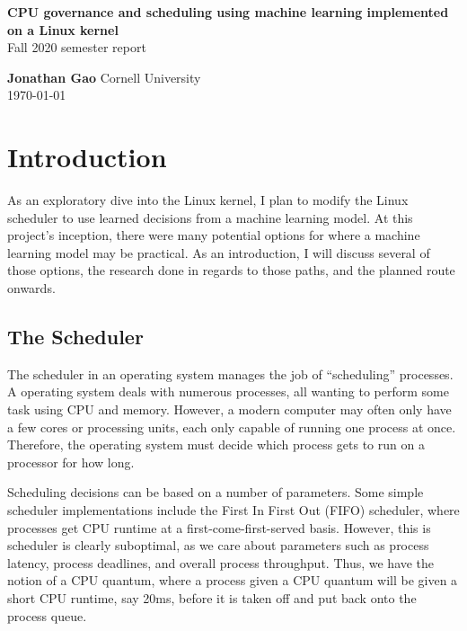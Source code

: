 \documentclass[12pt]{article}
\author{Jonathan Gao}
\def\ind{\hspace*{0.3in}}
\begin{document}
\begin{titlepage}
   \begin{center}
       \vspace*{5cm}
       {\huge\textbf{CPU governance and scheduling using machine learning implemented on a Linux kernel}}\\
       \vspace{1.5cm}
       {\large Fall 2020 semester report}
       \vspace{1.5cm}
       
       \textbf{Jonathan Gao}
       \vfill
       \vspace{0.8cm}
       Cornell University\\
       \today
            
   \end{center}
\end{titlepage}

\section*{Introduction}

\ind As an exploratory dive into the Linux kernel, I plan to modify the Linux scheduler to use learned decisions from a machine learning model. At this project's inception, there were many potential options for where a machine learning model may be practical. As an introduction, I will discuss several of those options, the research done in regards to those paths, and the planned route onwards. 

\subsection*{The Scheduler}

\ind The scheduler in an operating system manages the job of ``scheduling'' processes. A operating system deals with numerous processes, all wanting to perform some task using CPU and memory. However, a modern computer may often only have a few cores or processing units, each only capable of running one process at once. Therefore, the operating system must decide which process gets to run on a processor for how long.

Scheduling decisions can be based on a number of parameters. Some simple scheduler implementations include the First In First Out (FIFO) scheduler, where processes get CPU runtime at a first-come-first-served basis. However, this is scheduler is clearly suboptimal, as we care about parameters such as process latency, process deadlines, and overall process throughput. Thus, we have the notion of a CPU quantum, where a process given a CPU quantum will be given a short CPU runtime, say 20ms, before it is taken off and put back onto the process queue.
\end{document}
